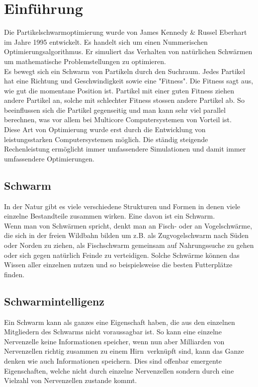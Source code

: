 \section{Einführung}
		Die Partikelschwarmoptimierung wurde von James Kennedy \& Russel Eberhart im Jahre 1995 entwickelt. Es handelt sich um einen Nummerischen Optimierungsalgorithmus. Er simuliert das Verhalten von natürlichen Schwärmen um mathematische Problemstellungen zu optimieren.\\
		Es bewegt sich ein Schwarm von Partikeln durch den Suchraum. Jedes Partikel hat eine Richtung und Geschwindigkeit sowie eine "Fitness". Die Fitness sagt aus, wie gut die momentane Position ist. Partikel mit einer guten Fitness ziehen andere Partikel an, solche mit schlechter Fitness stossen andere Partikel ab. So beeinflussen sich die Partikel gegenseitig und man kann sehr viel parallel berechnen, was vor allem bei Multicore Computersystemen von Vorteil ist. \\
		Diese Art von Optimierung wurde erst durch die Entwicklung von leistungsstarken Computersystemen möglich. Die ständig steigende Rechenleistung ermöglicht immer umfassendere Simulationen und damit immer umfassendere Optimierungen.
		\subsection{Schwarm}
		In der Natur gibt es viele verschiedene Strukturen und Formen in denen viele einzelne Bestandteile zusammen wirken. Eine davon ist ein Schwarm.\\
		Wenn man von Schwärmen spricht, denkt man an Fisch- oder an Vogelschwärme, die sich in der freien Wildbahn  bilden um z.B. als Zugvogelschwarm nach Süden oder Norden zu ziehen, als Fischschwarm gemeinsam auf Nahrungssuche zu gehen oder sich gegen natürlich Feinde zu verteidigen. Solche Schwärme können das Wissen aller einzelnen nutzen und so beispielsweise die besten Futterplätze finden.
		\subsection{Schwarmintelligenz}
		Ein Schwarm kann als ganzes eine Eigenschaft haben, die aus den einzelnen Mitgliedern des Schwarms nicht voraussagbar ist. So kann eine einzelne Nervenzelle keine Informationen speicher, wenn nun aber Milliarden von Nervenzellen richtig zusammen zu einem \textacutedbl Hirn\textacutedbl \ verknüpft sind, kann das Ganze denken wie auch Informationen speichern. Dies sind offenbar emergente Eigenschaften, welche nicht durch einzelne Nervenzellen sondern durch eine Vielzahl von Nervenzellen zustande kommt.
